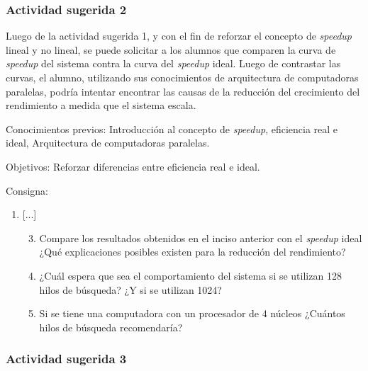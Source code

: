 \subsubsection{Actividad sugerida 2}

Luego de la actividad sugerida 1, y con el fin de reforzar el concepto de
\emph{speedup} lineal y no lineal, se puede solicitar a los alumnos que comparen
la curva de \emph{speedup} del sistema contra la curva del \emph{speedup} ideal.
Luego de contrastar las curvas, el alumno, utilizando sus conocimientos de
arquitectura de computadoras paralelas, podría intentar encontrar las causas de
la reducción del crecimiento del rendimiento a medida que el sistema escala.

\begin{description}

	\item{Conocimientos previos}: Introducción al concepto de
		\emph{speedup}, eficiencia real e ideal, Arquitectura de
		computadoras paralelas.

	\item{Objetivos}: Reforzar diferencias entre eficiencia real e ideal.

	\item{Consigna}: \begin{enumerate}

	\item{[...]

\begin{enumerate}

	\setcounter{enumii}{2}

	\item{Compare los resultados obtenidos en el inciso anterior con el
		\emph{speedup} ideal ¿Qué explicaciones posibles existen para la
		reducción del rendimiento?}

	\item{¿Cuál espera que sea el comportamiento del sistema si se utilizan
		128 hilos de búsqueda? ¿Y si se utilizan 1024?}

	\item{Si se tiene una computadora con un procesador de 4 núcleos
		¿Cuántos hilos de búsqueda recomendaría?}

\end{enumerate}}

\end{enumerate}

\end{description}

\subsubsection{Actividad sugerida 3}

